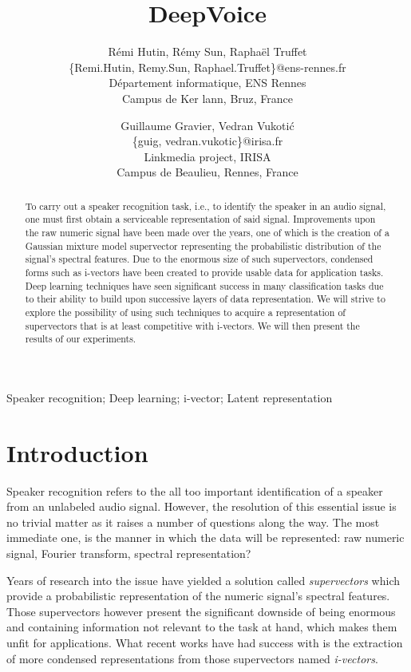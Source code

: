 \documentclass[conference]{IEEEtran}
\title{DeepVoice}
\author{Rémi Hutin, Rémy Sun, Raphaël Truffet \\
  \{Remi.Hutin, Remy.Sun, Raphael.Truffet\}@ens-rennes.fr \\
  Département informatique, ENS Rennes \\
  Campus de Ker lann, Bruz, France
\and
  Guillaume Gravier, Vedran Vukotić\\
  \{guig, vedran.vukotic\}@irisa.fr\\
  Linkmedia project, IRISA \\
  Campus de Beaulieu, Rennes, France
}
\begin{document}
\maketitle

\begin{abstract}
  To carry out a speaker recognition task, i.e., to identify the speaker in an
audio signal, one must first obtain a serviceable representation
of said signal. Improvements upon the raw numeric signal have been made over the
years, one of which is the creation of a Gaussian mixture model supervector
representing the probabilistic distribution of the signal's
spectral features. Due to the enormous size of such supervectors, condensed
forms such as i-vectors have been created to provide usable data for application
tasks. Deep learning techniques have seen significant success in many
classification tasks due to their ability to
build upon successive layers of data representation. We will
strive to explore the possibility of using such techniques to acquire a
representation of supervectors that is at least competitive with i-vectors.
We will then present the results of our experiments.

\end{abstract}
\begin{IEEEkeywords}
  Speaker recognition; Deep learning;  i-vector; Latent representation
\end{IEEEkeywords}
\section{Introduction}

Speaker recognition refers to the all too important identification of a speaker
from an unlabeled audio signal. However, the resolution of this essential issue
is no trivial matter as it raises a number of questions along the way. The most
immediate one, is the manner in which the data will be represented: raw numeric
signal, Fourier transform, spectral representation?

Years of research into the issue have yielded a solution called
\emph{supervectors} which provide a probabilistic representation of the
numeric signal's spectral features. Those supervectors however present the
significant downside of being enormous and containing information not relevant
to the task at hand, which makes them unfit for applications. What recent works
have had success with is the extraction of more condensed representations from
those supervectors named \emph{i-vectors}.
\end{document}
